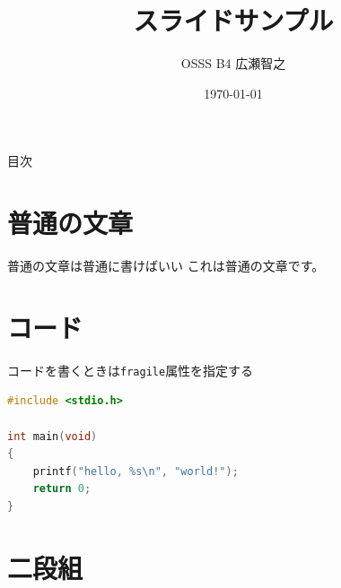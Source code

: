 \documentclass[unicode,12pt]{beamer}
\title{スライドサンプル}
\author{OSSS B4 広瀬智之}
\date{\today}
\begin{document}
\begin{frame}[plain]
  \titlepage
\end{frame}

\begin{frame}[plain]{目次}
  \tableofcontents
\end{frame}

\section{普通の文章}

\begin{frame}[plain]{普通の文章は普通に書けばいい}
これは普通の文章です。
\end{frame}

\section{コード}

\begin{frame}[fragile]{コードを書くときは\texttt{fragile}属性を指定する}
\begin{lstlisting}[language=c,caption=サンプルコード,label=code:sample]
#include <stdio.h>

int main(void)
{
    printf("hello, %s\n", "world!");
    return 0;
}
\end{lstlisting}
\end{frame}

\section{二段組}
\end{document}
